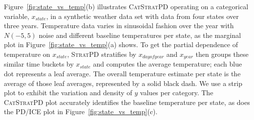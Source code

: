 \documentclass[12pt]{article}
\newcommand{\figref}[1]{Figure~\ref{#1}}
\newcommand{\spd}{\fontfamily{cmr}\textsc{\small StratPD}}
\newcommand{\cspd}{\fontfamily{cmr}\textsc{\small CatStratPD}}
\begin{document}
\figref{fig:state_vs_temp}(b) illustrates \cspd{} operating on a categorical variable, $x_{state}$, in a synthetic weather data set with data from four states over three years. Temperature data varies in sinusoidal fashion over the year with $N(-5,5)$ noise and different baseline temperatures per state, as the marginal plot in \figref{fig:state_vs_temp}(a) shows. To get the partial dependence of temperature on $x_{state}$, \spd{} stratifies by $x_{dayofyear}$ and $x_{year}$ then groups these similar time buckets by $x_{state}$ and computes the average temperature; each blue dot represents a leaf average. The overall temperature estimate per state is the average of those leaf averages, represented by a solid black dash. We use a strip plot to exhibit the variation and density of $y$ values per category. The \cspd{} plot accurately identifies the baseline temperature per state, as does the PD/ICE plot in \figref{fig:state_vs_temp}(c).
\end{document}
